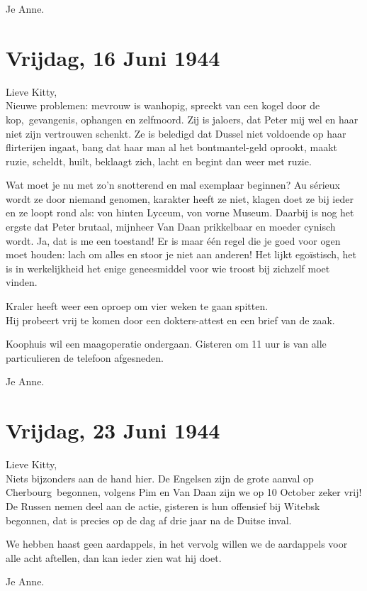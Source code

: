 \documentclass{book}
\begin{document}
Je Anne.

\section*{Vrijdag, 16 Juni 1944}

Lieve Kitty,\\
Nieuwe problemen: mevrouw is wanhopig, spreekt van een kogel door
de kop,~gevangenis, ophangen en zelfmoord. Zij is jaloers, dat Peter mij wel en
haar niet zijn vertrouwen schenkt. Ze is beledigd dat Dussel niet voldoende op
haar flirterijen ingaat, bang dat haar man al het bontmantel-geld oprookt, maakt
ruzie, scheldt, huilt, beklaagt zich, lacht en begint dan weer met ruzie.

Wat moet je nu met zo'n snotterend en mal exemplaar beginnen? Au sérieux wordt
ze door niemand genomen, karakter heeft ze niet, klagen doet ze bij ieder en ze
loopt rond als: von hinten Lyceum, von vorne Museum.  Daarbij is nog het ergste
dat Peter brutaal, mijnheer Van Daan prikkelbaar en moeder cynisch wordt. Ja,
dat is me een toestand! Er is maar één regel die je goed voor ogen moet houden:
lach om alles en stoor je niet aan anderen! Het lijkt egoïstisch, het is in
werkelijkheid het enige geneesmiddel voor wie troost bij zichzelf moet vinden.

Kraler heeft weer een oproep om vier weken te gaan spitten.\\
Hij probeert vrij
te komen door een dokters-attest en een brief van de zaak.

Koophuis wil een maagoperatie ondergaan. Gisteren om 11 uur is van alle
particulieren de telefoon afgesneden.

Je Anne.

\section*{Vrijdag, 23 Juni 1944}

Lieve Kitty,\\
Niets bijzonders aan de hand hier. De Engelsen zijn de grote
aanval op Cherbourg~begonnen, volgens Pim en Van Daan zijn we op 10 October
zeker vrij! De Russen nemen deel aan de actie, gisteren is hun offensief bij
Witebsk begonnen, dat is precies op de dag af drie jaar na de Duitse inval.

We hebben haast geen aardappels, in het vervolg willen we de aardappels voor
alle acht aftellen, dan kan ieder zien wat hij doet.

Je Anne.
\end{document}

